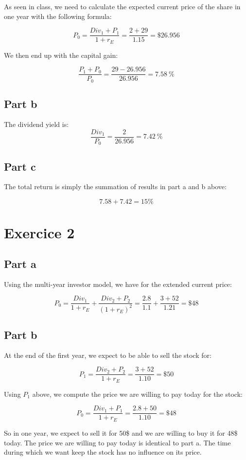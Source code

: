 \documentclass[a4paper,11pt,twoside]{article}
\def \be {\begin{equation}}
\def \ee {\end{equation}}
\begin{document}
As seen in class, we need to calculate the expected current price of the share in one year with the following formula:

\be
 P_0 = \frac{Div_1 + P_1}{1 + r_E} = \frac{2 + 29}{1.15} = \$26.956
\ee

We then end up with the capital gain:

\be
 \frac{P_1 + P_0}{P_0} = \frac{29 - 26.956}{26.956} = 7.58\ \%
 \ee
 
 \subsection*{Part b}
 The dividend yield is:
 \be
 \frac{Div_1}{P_0} = \frac{2}{26.956} = 7.42\ \%
 \ee
 
 \subsection*{Part c}
 
 The total return is simply the summation of results in part a and b above:
 
 
 \be
 7.58 + 7.42 = 15 \%
 \ee
\section*{Exercice 2}
\subsection*{Part a}
Using the multi-year investor model, we have for the extended current price:

\be
  P_0 = \frac{Div_1}{1 + r_E} + \frac{Div_2 + P_2}{(1 + r_E)^2} = \frac{2.8}{1.1} + \frac{3 + 52}{1.21} = \$ 48
\ee


\subsection*{Part b}


At the end of the first year, we expect to be able to sell the stock for:

\be
P_1=\frac{Div_2 + P_2}{1 + r_E} = \frac{3 + 52}{1.10} = \$50
\ee

Using $P_1$ above, we compute the price we are willing to pay today for the stock:

\be
P_0 = \frac{Div_1 + P_1}{1 + r_E} = \frac{2.8 + 50}{1.10} = \$48
\ee

So in one year, we expect to sell it for 50\$ and we are willing to buy it for 48\$ today. The price we are willing to pay today is identical to part a. The time during which we want keep the stock has no influence on its price. 
\end{document}
